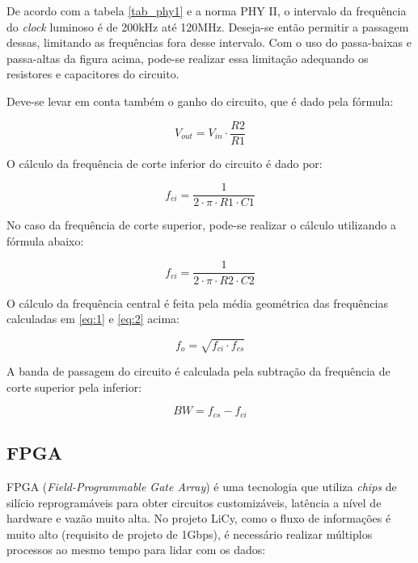 	De acordo com a tabela \ref{tab_phy1} e a norma PHY II, o intervalo da frequência do \textit{clock} luminoso é de 200kHz até 120MHz. Deseja-se então  permitir a passagem dessas, limitando as frequências fora desse intervalo. Com o uso do passa-baixas e passa-altas da figura acima, pode-se realizar essa limitação adequando os resistores e capacitores do circuito.

	Deve-se levar em conta também o ganho do circuito, que é dado pela fórmula:

	\begin{equation}
	V_{out} = V_{in} \cdot \frac{R2}{R1}
	\end{equation}

	O cálculo da frequência de corte inferior do circuito é dado por:

	\begin{equation} \label{eq:1}
	f_{ci} = \frac{1}{2 \cdot \pi \cdot R1 \cdot C1}
	\end{equation}

	No caso da frequência de corte superior, pode-se realizar o cálculo utilizando a fórmula abaixo:

	\begin{equation} \label{eq:2}
	f_{ci} = \frac{1}{2 \cdot \pi \cdot R2 \cdot C2}
	\end{equation}

	O cálculo da frequência central é feita pela média geométrica das frequências calculadas em \ref{eq:1} e \ref{eq:2} acima:

	\begin{equation} \label{eq:3}
	f_{o} = \sqrt{f_{ci} \cdot f_{cs}}
	\end{equation}

	A banda de passagem do circuito é calculada pela subtração da frequência de corte superior pela inferior:

	\begin{equation} \label{eq:4}
	BW = f_{cs} - f_{ci}
	\end{equation}

	\subsection{FPGA}\label{hard-fpga}

	FPGA (\textit{Field-Programmable Gate Array}) é uma tecnologia que utiliza \textit{chips} de silício reprogramáveis para obter circuitos customizáveis, latência a nível de hardware e vazão muito alta. No projeto LiCy, como o fluxo de informações é muito alto (requisito de projeto de 1Gbps), é necessário realizar múltiplos processos ao mesmo tempo para lidar com os dados:

